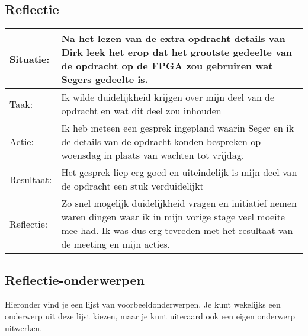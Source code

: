 \documentclass[a4paper,12pt]{article}
\begin{document}
\subsection*{Reflectie}
\begin{longtable}{|l|p{}|}
\hline
Situatie:   & Na het lezen van de extra opdracht details van Dirk leek het erop dat het grootste gedeelte van de opdracht op de FPGA zou gebruiren wat Segers gedeelte is. \\ \hline
Taak:   & Ik wilde duidelijkheid krijgen over mijn deel van de opdracht en wat dit deel zou inhouden \\ \hline
Actie:  & Ik heb meteen een gesprek ingepland waarin Seger en ik de details van de opdracht konden bespreken op woensdag in plaats van wachten tot vrijdag. \\ \hline
Resultaat: & Het gesprek liep erg goed en uiteindelijk is mijn deel van de opdracht een stuk verduidelijkt \\ \hline
Reflectie:   & Zo snel mogelijk duidelijkheid vragen en initiatief nemen waren dingen waar ik in mijn vorige stage veel moeite mee had. Ik was dus erg tevreden met het resultaat van de meeting en mijn acties.\\ \hline

\hline

\end{longtable}

\subsection*{Reflectie-onderwerpen}
Hieronder vind je een lijst van voorbeeldonderwerpen. Je kunt wekelijks een onderwerp uit deze lijst kiezen, maar je kunt uiteraard ook een eigen onderwerp uitwerken.
\end{document}
